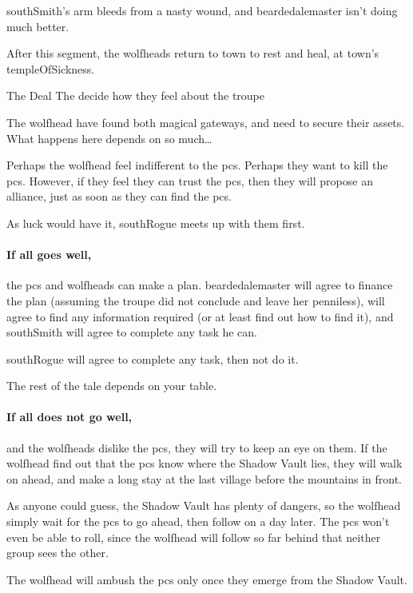 \Gls{southSmith}'s arm bleeds from a nasty wound, and \gls{beardedalemaster} isn't doing much better.

\setcounter{wounds}{3}
\beardedalemaster

\southRogue

After this \gls{segment}, the \glspl{wolfhead} return to \gls{town} to rest and heal, at \gls{town}'s \gls{templeOfSickness}.

{The Deal}%
{The  decide how they feel about the troupe}%

The \gls{wolfhead} have found both magical gateways, and need to secure their assets.
What happens here depends on so much\ldots

Perhaps the \gls{wolfhead} feel indifferent to the \glspl{pc}.
Perhaps they want to kill the \glspl{pc}.
However, if they feel they can trust the \glspl{pc}, then they will propose an alliance, just as soon as they can find the \glspl{pc}.

As luck would have it, \gls{southRogue} meets up with them first.

\paragraph{If all goes well,}
the \glspl{pc} and \glspl{wolfhead} can make a plan.
\Gls{beardedalemaster} will agree to finance the plan (assuming the troupe did not conclude  and leave her penniless),  will agree to find any information required (or at least find out how to find it), and \gls{southSmith} will agree to complete any task he can.

\Gls{southRogue} will agree to complete any task, then not do it.

The rest of the tale depends on your table.

\paragraph{If all does not go well,}
and the \glspl{wolfhead} dislike the \glspl{pc}, they will try to keep an eye on them.
If the \gls{wolfhead} find out that the \glspl{pc} know where the Shadow Vault lies, they will walk on ahead, and make a long stay at the last \gls{village} before the mountains in front.

As anyone could guess, the Shadow Vault has plenty of dangers, so the \gls{wolfhead} simply wait for the \glspl{pc} to go ahead, then follow on a day later.
The \glspl{pc} won't even be able to roll, since the \gls{wolfhead} will follow so far behind that neither group sees the other.

The \gls{wolfhead} will ambush the \glspl{pc} only once they emerge from the Shadow Vault.
